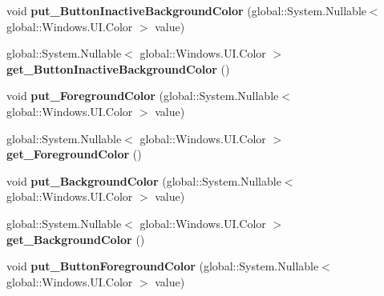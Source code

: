 \begin{DoxyCompactItemize}
void {\bfseries put\+\_\+\+Button\+Inactive\+Background\+Color} (global\+::\+System.\+Nullable$<$ global\+::\+Windows.\+U\+I.\+Color $>$ value)
\item 
\mbox{\label{interface_windows_1_1_u_i_1_1_view_management_1_1_i_application_view_title_bar_a6c110cc1abc214ae3ab4e3fad20dbd79}} 
global\+::\+System.\+Nullable$<$ global\+::\+Windows.\+U\+I.\+Color $>$ {\bfseries get\+\_\+\+Button\+Inactive\+Background\+Color} ()
\item 
\mbox{\label{interface_windows_1_1_u_i_1_1_view_management_1_1_i_application_view_title_bar_a2c9b8e377e58bb9b24d1831d431d7cb8}} 
void {\bfseries put\+\_\+\+Foreground\+Color} (global\+::\+System.\+Nullable$<$ global\+::\+Windows.\+U\+I.\+Color $>$ value)
\item 
\mbox{\label{interface_windows_1_1_u_i_1_1_view_management_1_1_i_application_view_title_bar_a5fe06168420ee342f2b206c5db71e9d4}} 
global\+::\+System.\+Nullable$<$ global\+::\+Windows.\+U\+I.\+Color $>$ {\bfseries get\+\_\+\+Foreground\+Color} ()
\item 
\mbox{\label{interface_windows_1_1_u_i_1_1_view_management_1_1_i_application_view_title_bar_a8f1570efd073d4f98de8305ea238203d}} 
void {\bfseries put\+\_\+\+Background\+Color} (global\+::\+System.\+Nullable$<$ global\+::\+Windows.\+U\+I.\+Color $>$ value)
\item 
\mbox{\label{interface_windows_1_1_u_i_1_1_view_management_1_1_i_application_view_title_bar_af30b2ae748ffe820b7b1c6f69ef893b1}} 
global\+::\+System.\+Nullable$<$ global\+::\+Windows.\+U\+I.\+Color $>$ {\bfseries get\+\_\+\+Background\+Color} ()
\item 
\mbox{\label{interface_windows_1_1_u_i_1_1_view_management_1_1_i_application_view_title_bar_a79b0e9d27826cb5e56af8d4a73f6cd2f}} 
void {\bfseries put\+\_\+\+Button\+Foreground\+Color} (global\+::\+System.\+Nullable$<$ global\+::\+Windows.\+U\+I.\+Color $>$ value)

\end{DoxyCompactItemize}
